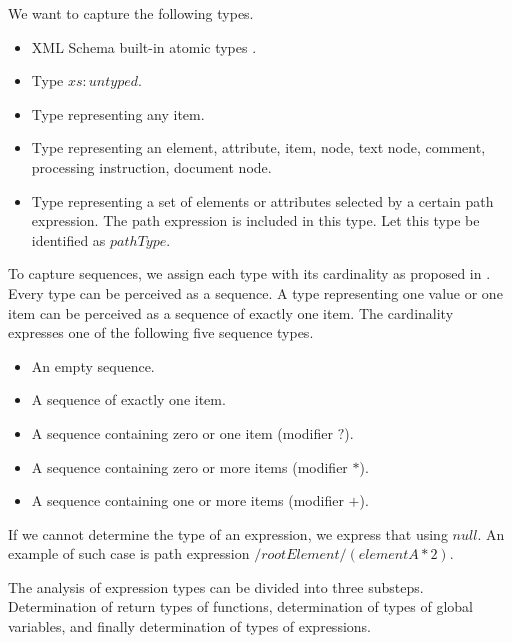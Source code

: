 We want to capture the following types.

\begin{itemize}
\item XML Schema built-in atomic types .
\item Type $xs:untyped$. 
\item Type representing any item. 
\item Type representing an element, attribute, item, node, text node, comment, processing instruction, document node.
\item Type representing a set of elements or attributes selected by a certain path expression. The path expression is included in this type. Let this type be identified as $pathType$.
\end{itemize}


To capture sequences, we assign each type with its cardinality as proposed in . Every type can be perceived as a sequence. A type representing one value or one item can be perceived as a sequence of exactly one item. The cardinality expresses one of the following five sequence types.

\begin{itemize}
\item An empty sequence.
\item A sequence of exactly one item.
\item A sequence containing zero or one item (modifier $?$).
\item A sequence containing zero or more items (modifier $*$).
\item A sequence containing one or more items (modifier $+$).
\end{itemize}

If we cannot determine the type of an expression, we express that using $null$. An example of such case is path expression $/rootElement/(elementA * 2)$. 

The analysis of expression types can be divided into three substeps. Determination of return types of functions, determination of types of global variables, and finally determination of types of expressions.


